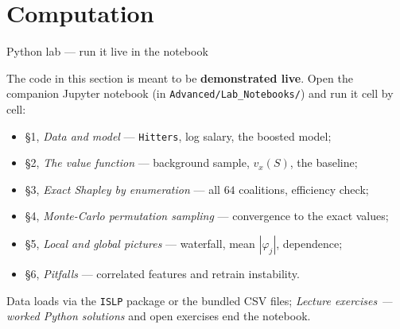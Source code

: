 \documentclass[aspectratio=169,11pt]{beamer}
\begin{document}
\section{Computation}

\begin{frame}{Python lab --- run it live in the notebook}
  \begin{labnote}
    The code in this section is meant to be \textbf{demonstrated live}. Open the
    companion Jupyter notebook (in \texttt{Advanced/Lab\_Notebooks/}) and run it
    cell by cell:
    \begin{itemize}
      \item \S1, \emph{Data and model} --- \texttt{Hitters}, log salary, the boosted model;
      \item \S2, \emph{The value function} --- background sample, $v_x(S)$, the baseline;
      \item \S3, \emph{Exact Shapley by enumeration} --- all $64$ coalitions, efficiency check;
      \item \S4, \emph{Monte-Carlo permutation sampling} --- convergence to the exact values;
      \item \S5, \emph{Local and global pictures} --- waterfall, mean $|\varphi_j|$, dependence;
      \item \S6, \emph{Pitfalls} --- correlated features and retrain instability.
    \end{itemize}
    Data loads via the \texttt{ISLP} package or the bundled CSV files;
    \emph{Lecture exercises --- worked Python solutions} and open exercises end
    the notebook.
  \end{labnote}
\end{frame}
\end{document}
